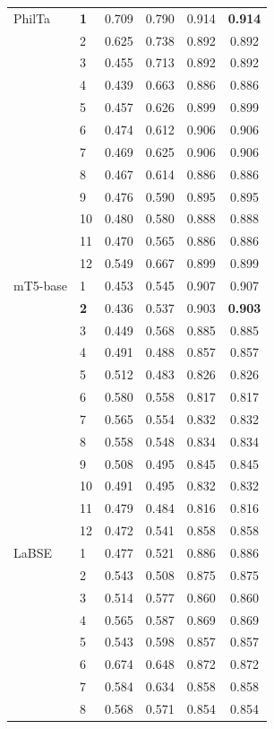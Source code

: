 \begin{longtable}{llcccc}
\midrule
PhilTa & \textbf{1} & 0.709 & 0.790 & 0.914 & \textbf{0.914} \\
 & 2 & 0.625 & 0.738 & 0.892 & 0.892 \\
 & 3 & 0.455 & 0.713 & 0.892 & 0.892 \\
 & 4 & 0.439 & 0.663 & 0.886 & 0.886 \\
 & 5 & 0.457 & 0.626 & 0.899 & 0.899 \\
 & 6 & 0.474 & 0.612 & 0.906 & 0.906 \\
 & 7 & 0.469 & 0.625 & 0.906 & 0.906 \\
 & 8 & 0.467 & 0.614 & 0.886 & 0.886 \\
 & 9 & 0.476 & 0.590 & 0.895 & 0.895 \\
 & 10 & 0.480 & 0.580 & 0.888 & 0.888 \\
 & 11 & 0.470 & 0.565 & 0.886 & 0.886 \\
 & 12 & 0.549 & 0.667 & 0.899 & 0.899 \\
\midrule
mT5-base & 1 & 0.453 & 0.545 & 0.907 & 0.907 \\
 & \textbf{2} & 0.436 & 0.537 & 0.903 & \textbf{0.903} \\
 & 3 & 0.449 & 0.568 & 0.885 & 0.885 \\
 & 4 & 0.491 & 0.488 & 0.857 & 0.857 \\
 & 5 & 0.512 & 0.483 & 0.826 & 0.826 \\
 & 6 & 0.580 & 0.558 & 0.817 & 0.817 \\
 & 7 & 0.565 & 0.554 & 0.832 & 0.832 \\
 & 8 & 0.558 & 0.548 & 0.834 & 0.834 \\
 & 9 & 0.508 & 0.495 & 0.845 & 0.845 \\
 & 10 & 0.491 & 0.495 & 0.832 & 0.832 \\
 & 11 & 0.479 & 0.484 & 0.816 & 0.816 \\
 & 12 & 0.472 & 0.541 & 0.858 & 0.858 \\
\midrule
LaBSE & 1 & 0.477 & 0.521 & 0.886 & 0.886 \\
 & 2 & 0.543 & 0.508 & 0.875 & 0.875 \\
 & 3 & 0.514 & 0.577 & 0.860 & 0.860 \\
 & 4 & 0.565 & 0.587 & 0.869 & 0.869 \\
 & 5 & 0.543 & 0.598 & 0.857 & 0.857 \\
 & 6 & 0.674 & 0.648 & 0.872 & 0.872 \\
 & 7 & 0.584 & 0.634 & 0.858 & 0.858 \\
 & 8 & 0.568 & 0.571 & 0.854 & 0.854 \\

\end{longtable}
